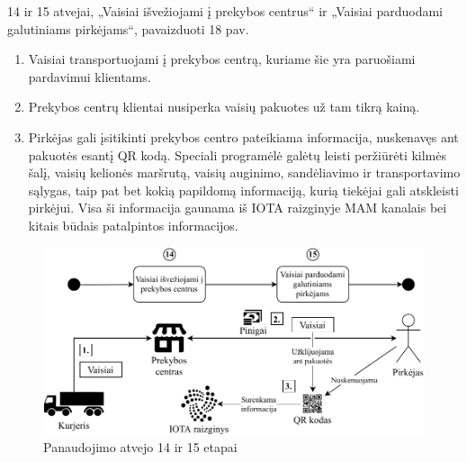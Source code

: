 14 ir 15 atvejai, „Vaisiai išvežiojami į prekybos centrus“ ir „Vaisiai parduodami galutiniams pirkėjams“, pavaizduoti 18 pav.
\begin{enumerate}
    \item Vaisiai transportuojami į prekybos centrą, kuriame šie yra paruošiami pardavimui klientams.
    \item Prekybos centrų klientai nusiperka vaisių pakuotes už tam tikrą kainą.
    \item Pirkėjas gali įsitikinti prekybos centro pateikiama informacija, nuskenavęs ant pakuotės esantį QR kodą. Speciali programėlė galėtų leisti peržiūrėti kilmės šalį, vaisių kelionės maršrutą, vaisių auginimo, sandėliavimo ir transportavimo sąlygas, taip pat bet kokią papildomą informaciją, kurią tiekėjai gali atskleisti pirkėjui. Visa ši informacija gaunama iš IOTA raizginyje MAM kanalais bei kitais būdais patalpintos informacijos.
\end{enumerate}

\begin{figure}[H]
    \centering
    \includegraphics[scale=0.7]{images/iota-usecase-14-15}
    \caption{Panaudojimo atvejo 14 ir 15 etapai}
\end{figure}